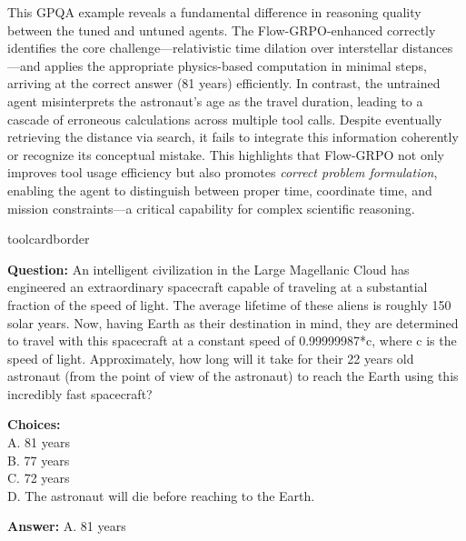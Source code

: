 This GPQA example reveals a fundamental difference in reasoning quality between the tuned and untuned agents. The Flow-GRPO-enhanced \model correctly identifies the core challenge—relativistic time dilation over interstellar distances—and applies the appropriate physics-based computation in minimal steps, arriving at the correct answer (81 years) efficiently. In contrast, the untrained agent misinterprets the astronaut's age as the travel duration, leading to a cascade of erroneous calculations across multiple tool calls. Despite eventually retrieving the distance via search, it fails to integrate this information coherently or recognize its conceptual mistake. This highlights that Flow-GRPO not only improves tool usage efficiency but also promotes \textit{correct problem formulation}, enabling the agent to distinguish between proper time, coordinate time, and mission constraints—a critical capability for complex scientific reasoning.

\begin{custombox}[title=Example from \# GPQA]{toolcardborder}

\textbf{Question:} An intelligent civilization in the Large Magellanic Cloud has engineered an extraordinary spacecraft capable of traveling at a substantial fraction of the speed of light. The average lifetime of these aliens is roughly 150 solar years. Now, having Earth as their destination in mind, they are determined to travel with this spacecraft at a constant speed of 0.99999987*c, where c is the speed of light. Approximately, how long will it take for their 22 years old astronaut (from the point of view of the astronaut) to reach the Earth using this incredibly fast spacecraft?

\textbf{Choices:} \\
A. 81 years \\
B. 77 years \\
C. 72 years \\
D. The astronaut will die before reaching to the Earth.

\vspace{1em}

\textbf{Answer:} A. 81 years
\end{custombox}


